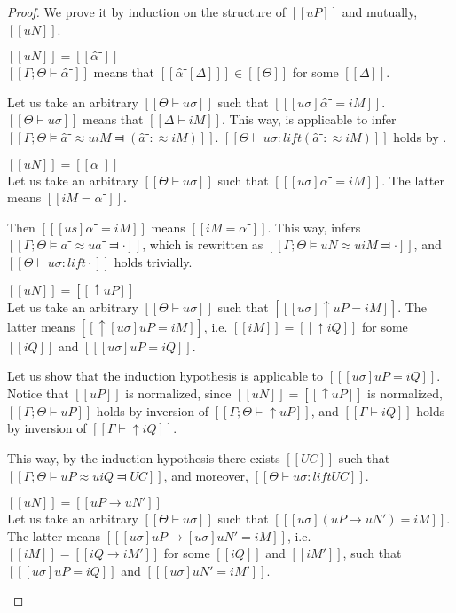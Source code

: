 \begin{proof}
    We prove it by induction on the structure of $[[uP]]$ and mutually, $[[uN]]$.
    \begin{caseof}
        \item $[[uN]] = [[α̂⁻]]$\\
            $[[Γ ; Θ ⊢ α̂⁻]]$ means that $[[ α̂⁻[Δ] ]] \in [[Θ]]$ for some $[[Δ]]$.

            Let us take an arbitrary $[[Θ ⊢ uσ]]$ such that $[[ [uσ]α̂⁻ = iM ]]$.
            $[[Θ ⊢ uσ]]$ means that $[[Δ ⊢ iM]]$.
            This way,  is applicable to infer 
            $[[Γ ; Θ ⊨ â⁻ ≈u iM ⫤ (â⁻ :≈ iM)]]$.
            $[[Θ ⊢ uσ : lift (â⁻ :≈ iM)]]$ holds by . 
            
        \item $[[uN]] = [[α⁻]]$\\
            Let us take an arbitrary $[[Θ ⊢ uσ]]$ such that $[[ [uσ]α⁻ = iM ]]$.
            The latter means $[[iM = α⁻]]$.

            Then $[[ [us]α⁻ = iM ]]$ means $[[iM = α⁻]]$.
            This way,  infers 
            $[[Γ; Θ ⊨ a⁻ ≈u a⁻ ⫤ ·]]$, which is rewritten as $[[Γ; Θ ⊨ uN ≈u iM ⫤ ·]]$, 
            and $[[Θ ⊢ uσ : lift ·]]$ holds trivially.

        \item $[[uN]] = [[↑uP]]$\\
            Let us take an arbitrary $[[Θ ⊢ uσ]]$ such that $[[ [uσ]↑uP = iM ]]$.
            The latter means $[[ ↑[uσ]uP = iM ]]$, i.e.
            $[[iM]] = [[↑iQ]]$ for some $[[iQ]]$ and $[[ [uσ]uP = iQ ]]$.

            Let us show that the induction hypothesis is applicable to $[[ [uσ]uP = iQ ]]$.
            Notice that $[[uP]]$ is normalized, since $[[uN]] = [[↑uP]]$ is normalized,
            $[[Γ ; Θ ⊢ uP]]$ holds by inversion of $[[Γ ; Θ ⊢ ↑uP]]$, 
            and $[[Γ ⊢ iQ]]$ holds by inversion of $[[Γ ⊢ ↑iQ]]$.

            This way, by the induction hypothesis there exists $[[UC]]$ such that
            $[[Γ ; Θ ⊨ uP ≈u iQ ⫤ UC]]$, and moreover, $[[Θ ⊢ uσ : lift UC]]$.
            
        \item $[[uN]] = [[uP → uN']]$\\
            Let us take an arbitrary $[[Θ ⊢ uσ]]$ such that $[[ [uσ](uP → uN') = iM ]]$.
            The latter means $[[ [uσ]uP → [uσ]uN' = iM ]]$, i.e.
            $[[iM]] = [[iQ → iM']]$ for some $[[iQ]]$ and $[[iM']]$, 
            such that $[[ [uσ]uP = iQ ]]$ and $[[ [uσ]uN' = iM' ]]$.


\end{caseof}
\end{proof}
